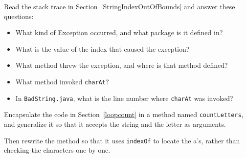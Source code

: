 \begin{exercise}
Read the stack trace in Section~\ref{StringIndexOutOfBounds}
and answer these questions:

\begin{itemize}

\item What kind of Exception occurred, and what package is it defined
in?

\item What is the value of the index that caused the exception?

\item What method threw the exception, and where is
that method defined?

\item What method invoked {\tt charAt}?

\item In {\tt BadString.java}, what is the line number where {\tt charAt}
was invoked?

\end{itemize}

\end{exercise}

\begin{exercise}

Encapsulate the code in Section~\ref{loopcount} in a method named
{\tt countLetters}, and generalize it so that it accepts the
string and the letter as arguments.

Then rewrite the method so that it uses
{\tt indexOf} to locate the a's, rather than checking
the characters one by one.

\end{exercise}

